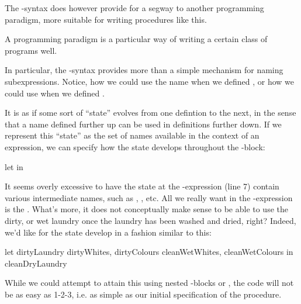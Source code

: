 The -syntax does however provide for a segway to another programming
paradigm, more suitable for writing procedures like this.

\begin{definition}

A programming paradigm is a particular way of writing a certain class of
programs well.

\end{definition}

In particular, the -syntax provides more than a simple mechanism for
naming subexpressions. Notice, how we could use the name  when
we defined , or how we could use  when
we defined .

It is as if some sort of ``state'' evolves from one defintion to the next, in
the sense that a name defined further up can be used in definitions further
down. If we represent this ``state'' as the set of names available in the
context of an expression, we can specify how the state develops throughout the
-block: 

\begin{codebox}
\li let
\li in
\end{codebox}

It seems overly excessive to have the state at the -expression (line
7) contain various intermediate names, such as ,
, etc. All we really want in the -expression is
the . What's more, it does not conceptually make sense to be
able to use the dirty, or wet laundry once the laundry has been washed and
dried, right? Indeed, we'd like for the state develop in a fashion similar to
this:

\begin{code}
let
  {dirtyLaundry}
  {dirtyWhites, dirtyColours}
  {cleanWetWhites, cleanWetColours}
in
  {cleanDryLaundry}
\end{code}

While we could attempt to attain this using nested -blocks or
, the code will not be as easy as 1-2-3, i.e.  as
simple as our initial specification of the procedure.

